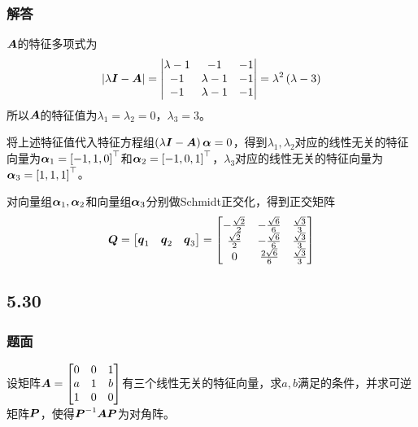 \documentclass{beamer}
\begin{document}
\begin{frame}[allowframebreaks]
    \frametitle{解答}
    \(\boldsymbol{A}\)的特征多项式为
    \begin{equation*}
        \left|\lambda\boldsymbol{I}-\boldsymbol{A} \right|=\begin{vmatrix}\lambda-1&-1&-1\\-1&\lambda-1&-1\\-1&\lambda-1&-1\end{vmatrix}=\lambda^2\left( \lambda-3 \right)
    \end{equation*}
    所以\(\boldsymbol{A}\)的特征值为\(\lambda_1=\lambda_2=0\)，\(\lambda_3=3\)。

    将上述特征值代入特征方程组\(\left( \lambda\boldsymbol{I}-\boldsymbol{A} \right)\boldsymbol{\alpha}=0\)，得到\(\lambda_1,\lambda_2\)对应的线性无关的特征向量为\(\boldsymbol{\alpha}_1=\left[ -1,1,0 \right]^\top\)和\(\boldsymbol{\alpha}_2=\left[ -1,0,1 \right]^\top\)，\(\lambda_3\)对应的线性无关的特征向量为\(\boldsymbol{\alpha}_3=\left[ 1,1,1 \right]^\top\)。

    对向量组\(\boldsymbol{\alpha}_1,\boldsymbol{\alpha}_2\)和向量组\(\boldsymbol{\alpha}_3\)分别做Schmidt正交化，得到正交矩阵
    \begin{equation*}
        \boldsymbol{Q}=\begin{bmatrix}\boldsymbol{q}_1&\boldsymbol{q}_2&\boldsymbol{q}_3\end{bmatrix}=
        \begin{bmatrix}
            -\frac{\sqrt{2}}{2} & -\frac{\sqrt{6}}{6} & \frac{\sqrt{3}}{3} \\
            \frac{\sqrt{2}}{2}  & -\frac{\sqrt{6}}{6} & \frac{\sqrt{3}}{3} \\
            0                   & \frac{2\sqrt{6}}{6} & \frac{\sqrt{3}}{3}
        \end{bmatrix}
    \end{equation*}
\end{frame}

\subsection*{5.30}
\begin{frame}
    \frametitle{题面}
    设矩阵\(\boldsymbol{A}=\begin{bmatrix}0&0&1\\a&1&b\\1&0&0\end{bmatrix}\)有三个线性无关的特征向量，求\(a,b\)满足的条件，并求可逆矩阵\(\boldsymbol{P}\)，使得\({\boldsymbol{P}}^{-1}\boldsymbol{A}\boldsymbol{P}\)为对角阵。
\end{frame}
\end{document}
